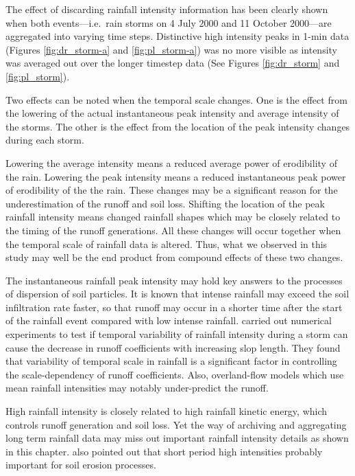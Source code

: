 The effect of discarding rainfall intensity information has been clearly shown
when both events---i.e.\ rain storms on 4 July 2000 and 11 October 2000---are
aggregated into varying time steps. Distinctive high intensity peaks in 1-min
data (Figures \ref{fig:dr_storm-a} and \ref{fig:pl_storm-a}) was no more visible
as intensity was averaged out over the longer timestep data (See Figures
\ref{fig:dr_storm} and \ref{fig:pl_storm}).

Two effects can be noted when the temporal scale changes. One is the effect from
the lowering of the actual instantaneous peak intensity and average intensity of
the storms. The other is the effect from the location of the peak intensity
changes during each storm.

Lowering the average intensity means a reduced average power of erodibility of
the rain. Lowering the peak intensity means a reduced instantaneous peak power
of erodibility of the the rain. These changes may be a significant reason
for the underestimation of the runoff and soil loss. Shifting the location of
the peak rainfall intensity means changed rainfall shapes which may be closely
related to the timing of the runoff generations. All these changes will occur
together when the temporal scale of rainfall data is altered. Thus, what we
observed in this study may well be the end product from compound effects of
these two changes.

The instantaneous rainfall peak intensity may hold key answers to the processes
of dispersion of soil particles. It is known that intense rainfall may exceed
the soil infiltration rate faster, so that runoff may occur in a shorter time
after the start of the rainfall event compared with low intense rainfall.
\citet{wainwright2002-1271} carried out numerical experiments to test if
temporal variability of rainfall intensity during a storm can cause the decrease
in runoff coefficients with increasing slop length. They found that variability
of temporal scale in rainfall is a significant factor in controlling the
scale-dependency of runoff coefficients. Also, overland-flow models which use
mean rainfall intensities may notably under-predict the runoff.

High rainfall intensity is closely related to high rainfall kinetic energy,
which controls runoff generation and soil loss. Yet the way of archiving and
aggregating long term rainfall data may miss out important rainfall intensity
details as shown in this chapter. \citet{boardman1987-36} also pointed out that
short period high intensities probably important for soil erosion processes.

